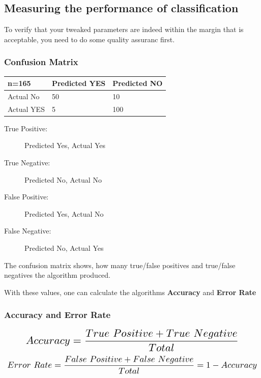 \documentclass[a4paper, 11pt]{article}
\renewcommand*{\thead}[1]{\bfseries #1}
\begin{document}
\subsection{Measuring the performance of classification}

To verify that your tweaked parameters are indeed within the margin that is acceptable, you need to do some quality assuranc first.

\subsubsection{Confusion Matrix}

\begin{minipage}{0.45\textwidth}
    \begin{tabular}{|p{1.5cm}|p{1.5cm}|p{1.5cm}|}
        \hline
        \thead{n=165} & Predicted YES & Predicted NO \\
        \hline
        Actual No & 50 & 10 \\
        \hline
        Actual YES & 5 & 100  \\
        \hline
    \end{tabular}
\end{minipage}\hfill
\begin{minipage}{0.55\textwidth}
    \begin{description}
        \item[True Positive: ] Predicted Yes, Actual Yes
        \item[True Negative: ] Predicted No, Actual No
        \item[False Positive: ] Predicted Yes, Actual No
        \item[False Negative: ] Predicted No, Actual Yes
    \end{description}
\end{minipage}

\vspace{10px}

The confusion matrix shows, how many true/false positives and true/false negatives the algorithm produced. 

With these values, one can calculate the algorithms \textbf{Accuracy} and \textbf{Error Rate}

\subsubsection{Accuracy and Error Rate}

\[\scalebox{1.5}{
        $Accuracy = \dfrac{True\ Positive + True\ Negative}{Total}$ 
}\]
\vspace{10px}
\[\scalebox{1.5}{
        $Error\ Rate = \dfrac{False\ Positive + False\ Negative}{Total} = 1 - Accuracy$
}\]
\end{document}
